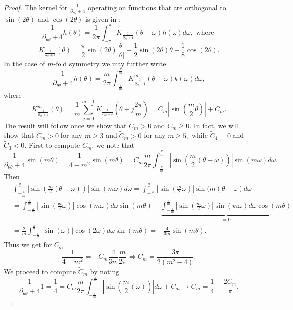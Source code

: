 \documentclass[10pt]{article}
\numberwithin{equation}{section}
\theoremstyle{plain}
\theoremstyle{definition}
\numberwithin{equation}{section}
\begin{document}
\begin{proof}
The kernel for $\frac{1}{\partial_{\theta\theta}+4}$ operating on functions that are orthogonal to $\sin(2\theta)$ and $\cos(2\theta)$ is given in \cite{EJ-symmetries}:
\begin{equation}\label{kernel formula}
\frac{1}{\partial_{\theta \theta}+4}h(\theta)=\frac{1}{2\pi}\int^{\pi}_{-\pi} K_{\frac{1}{\partial_{\theta \theta}+4}}(\theta-\omega)h(\omega)d\omega, \text{ where }
\end{equation}
\begin{equation}
    K_{\frac{1}{\partial_{\theta \theta}+4}}(\theta)=\frac{\pi}{2}\sin(2\theta)\frac{\theta}{|\theta|}-\frac{1}{2}\sin(2\theta)\theta-\frac{1}{8}\cos(2\theta).
\end{equation}
In the case of $m$-fold symmetry we may further write
\[
\frac{1}{\partial_{\theta \theta}+4}h(\theta)=\frac{m}{2\pi}\int^{\frac{\pi}{m}}_{-\frac{\pi}{m}} {K^m_{\frac{1}{\partial_{\theta \theta}+4}}}(\theta-\omega)h(\omega)d\omega,
\]
where 
\[
{K^m_{\frac{1}{\partial_{\theta \theta}+4}}}(\theta)=\frac{1}{m}\sum^{m-1}_{j=0}{K_{\frac{1}{\partial_{\theta \theta}+4}}}\left(\theta+j\frac{2\pi}{m}\right)=C_m\left|\sin\left(\frac{m}{2}\theta\right)\right|+\tilde{C}_m.
\]
The result will follow once we show that $C_m>0$ and $\tilde C_m\geq 0.$ In fact, we will show that $C_m>0$ for any $m\geq 3$ and $\tilde C_m>0$ for any $m\geq 5,$ while $\tilde C_4=0$ and $\tilde C_3<0.$
First to compute $C_m$, we note that
\[
\frac{1}{\partial_{\theta \theta}+4}\sin(m\theta)=\frac{1}{4-m^2}\sin(m\theta)=C_m\frac{m}{2\pi}\int^{\frac{\pi}{m}}_{-\frac{\pi}{m}} \left|\sin\left(\frac{m}{2}(\theta-\omega)\right)\right|\sin(m\omega)d\omega.
\]
Then 
\begin{align*}
&\int^{\frac{\pi}{m}}_{-\frac{\pi}{m}} \left|\sin\left(\frac{m}{2}(\theta-\omega)\right)\right|\sin(m\omega)d\omega=\int^{\frac{\pi}{m}}_{-\frac{\pi}{m}} \left|\sin\left(\frac{m}{2}\omega\right)\right|\sin(m(\theta-\omega)d\omega\\
&=\int^{\frac{\pi}{m}}_{-\frac{\pi}{m}} \left|\sin\left(\frac{m}{2}\omega\right)\right|\cos(m\omega)d\omega\sin(m\theta)-\underbrace{\int^{\frac{\pi}{m}}_{-\frac{\pi}{m}} \left|\sin\left(\frac{m}{2}\omega\right)\right|\sin(m\omega)d\omega\cos(m\theta)}_{=0}\\
&=\frac{2}{m}\int^{\frac{\pi}{2}}_{-\frac{\pi}{2}} \left|\sin\left(\omega\right)\right|\cos(2\omega)d\omega\sin(m\theta)=-\frac{4}{3m}\sin(m\theta).
\end{align*}
Thus we get for $C_m$
\[
\frac{1}{4-m^2}=-C_m\frac{4}{3m}\frac{m}{2\pi} \Longleftrightarrow C_m= \frac{3\pi}{2(m^2-4)}.
\]
We proceed to compute $\tilde{C}_m$ by noting
\[
\frac{1}{\partial_{\theta \theta}+4}1=\frac{1}{4}=C_m\frac{m}{2\pi}\int^{\frac{\pi}{m}}_{-\frac{\pi}{m}} \left|\sin\left(\frac{m}{2}(\omega)\right)\right|d\omega+\tilde{C}_m \longrightarrow \tilde{C}_m=\frac{1}{4}-\frac{2C_m}{\pi}.
\]
\end{proof}
\end{document}
